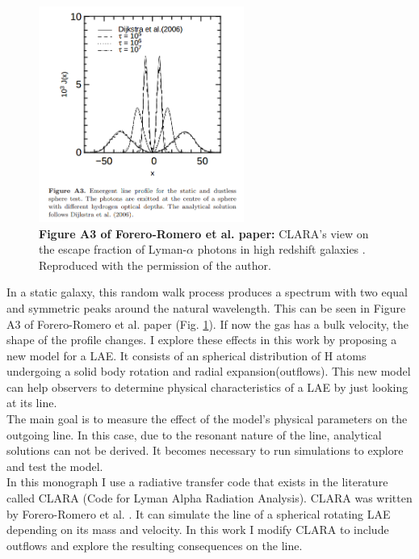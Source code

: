 \begin{figure}[h!]
	\begin{center}
		\includegraphics[width=0.6\textwidth]{./figures/chapter1/static}
	\end{center}
	\caption{\textbf{Figure A3 of Forero-Romero et al. paper:} CLARA's view on the escape fraction of Lyman-$\alpha$ photons in high redshift galaxies \cite{CLARA}. Reproduced with the permission of the author.
		\label{fig:static}}
\end{figure}

In a static galaxy, this random walk process produces a spectrum with two equal and symmetric peaks around the natural \lya wavelength. This can be seen in Figure A3 of Forero-Romero et al. paper \cite{CLARA} (Fig. \ref{fig:static}). If now the gas has a bulk velocity, the shape of the \lya profile changes. I explore these effects in this work by proposing a new model for a LAE. It consists of an spherical distribution of H atoms undergoing a solid body rotation and radial expansion(outflows). This new model can help observers to determine physical characteristics of a LAE by just looking at its \lya line. \\

The main goal is to measure the effect of the model's physical parameters on the outgoing \lya line. In this case, due to the resonant nature of the \lya line, analytical solutions can not be derived. It becomes necessary to run simulations to explore and test the model. \\

In this monograph I use a radiative transfer code that exists in the literature called CLARA (Code for Lyman Alpha Radiation Analysis). CLARA was written by Forero-Romero et al. \cite{CLARA}. It can simulate the \lya line of a spherical rotating LAE depending on its mass and velocity. In this work I modify CLARA to include outflows and explore the resulting consequences on the \lya line. \\